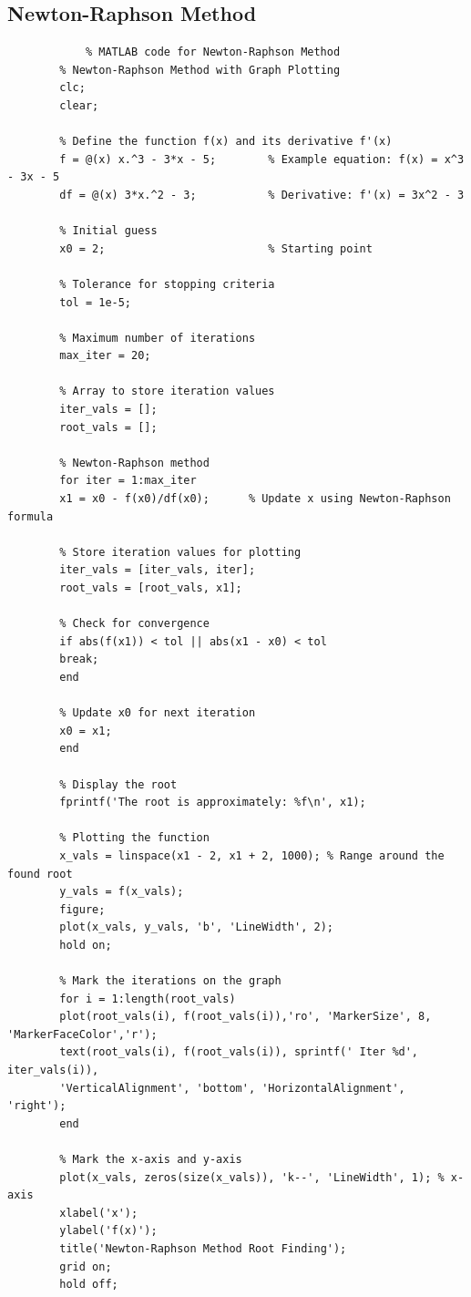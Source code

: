 \documentclass[12pt,a4paper]{article}
\begin{document}
\subsection{Newton-Raphson Method}
\lstset{ 
	basicstyle=\ttfamily,  
	breaklines=true,       
	frame=single,          
	numbers=left,          
	showstringspaces=false, 
	xleftmargin=0pt,       %
	framexleftmargin=0pt   %
}
	\begin{lstlisting}
			% MATLAB code for Newton-Raphson Method
		% Newton-Raphson Method with Graph Plotting
		clc;
		clear;
		
		% Define the function f(x) and its derivative f'(x)
		f = @(x) x.^3 - 3*x - 5;        % Example equation: f(x) = x^3 - 3x - 5
		df = @(x) 3*x.^2 - 3;           % Derivative: f'(x) = 3x^2 - 3
		
		% Initial guess
		x0 = 2;                         % Starting point
		
		% Tolerance for stopping criteria
		tol = 1e-5;
		
		% Maximum number of iterations
		max_iter = 20;
		
		% Array to store iteration values
		iter_vals = [];
		root_vals = [];
		
		% Newton-Raphson method
		for iter = 1:max_iter
		x1 = x0 - f(x0)/df(x0);      % Update x using Newton-Raphson formula
		
		% Store iteration values for plotting
		iter_vals = [iter_vals, iter];
		root_vals = [root_vals, x1];
		
		% Check for convergence
		if abs(f(x1)) < tol || abs(x1 - x0) < tol
		break;
		end
		
		% Update x0 for next iteration
		x0 = x1;
		end
		
		% Display the root
		fprintf('The root is approximately: %f\n', x1);
		
		% Plotting the function
		x_vals = linspace(x1 - 2, x1 + 2, 1000); % Range around the found root
		y_vals = f(x_vals);
		figure;
		plot(x_vals, y_vals, 'b', 'LineWidth', 2);
		hold on;
		
		% Mark the iterations on the graph
		for i = 1:length(root_vals)
		plot(root_vals(i), f(root_vals(i)),'ro', 'MarkerSize', 8, 'MarkerFaceColor','r');
		text(root_vals(i), f(root_vals(i)), sprintf(' Iter %d', iter_vals(i)),
		'VerticalAlignment', 'bottom', 'HorizontalAlignment', 'right');
		end
		
		% Mark the x-axis and y-axis
		plot(x_vals, zeros(size(x_vals)), 'k--', 'LineWidth', 1); % x-axis
		xlabel('x');
		ylabel('f(x)');
		title('Newton-Raphson Method Root Finding');
		grid on;
		hold off;
		
	\end{lstlisting}
	
\end{document}
